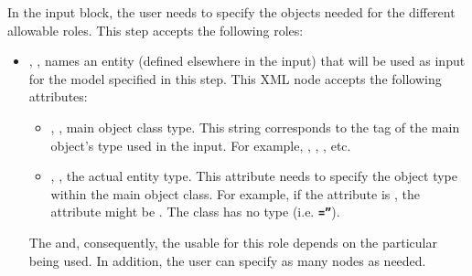 In the  input block, the user needs to specify the objects
needed for the different allowable roles.
%
This step accepts the following roles:
\begin{itemize}
\item {}, , names an entity
(defined elsewhere in the input) that will be used as input for the model
specified in this step.
This XML node accepts the following attributes:
\begin{itemize}
  \item {}, , main object class
    type.
    This string corresponds to the tag of the main object's type used in the 
    input.
    For example, , , ,
    etc.
  \item {}, , the actual entity
    type.
    This attribute needs to specify the object type within the main object
    class.
    For example, if the   attribute is , the
     attribute might be .
    \nb The class  has no type (i.e. 
    \textbf{\texttt{=''}}).
\end{itemize}

\nb The  and, consequently, the  usable for this
role depends on the particular  being used.
%
In addition, the user can specify as many  nodes as needed.


\end{itemize}
